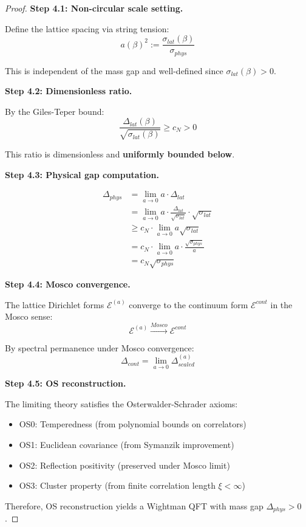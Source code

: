 \begin{proof}
\textbf{Step 4.1: Non-circular scale setting.}

Define the lattice spacing via string tension:
\begin{equation}
a(\beta)^2 := \frac{\sigma_{lat}(\beta)}{\sigma_{phys}}
\end{equation}

This is independent of the mass gap and well-defined since $\sigma_{lat}(\beta) > 0$.

\textbf{Step 4.2: Dimensionless ratio.}

By the Giles-Teper bound:
\begin{equation}
\frac{\Delta_{lat}(\beta)}{\sqrt{\sigma_{lat}(\beta)}} \geq c_N > 0
\end{equation}

This ratio is dimensionless and \textbf{uniformly bounded below}.

\textbf{Step 4.3: Physical gap computation.}

\begin{align}
\Delta_{phys} &= \lim_{a \to 0} a \cdot \Delta_{lat} \\
&= \lim_{a \to 0} a \cdot \frac{\Delta_{lat}}{\sqrt{\sigma_{lat}}} \cdot \sqrt{\sigma_{lat}} \\
&\geq c_N \cdot \lim_{a \to 0} a \sqrt{\sigma_{lat}} \\
&= c_N \cdot \lim_{a \to 0} a \cdot \frac{\sqrt{\sigma_{phys}}}{a} \\
&= c_N \sqrt{\sigma_{phys}}
\end{align}

\textbf{Step 4.4: Mosco convergence.}

The lattice Dirichlet forms $\mathcal{E}^{(a)}$ converge to the continuum 
form $\mathcal{E}^{cont}$ in the Mosco sense:
\begin{equation}
\mathcal{E}^{(a)} \xrightarrow{Mosco} \mathcal{E}^{cont}
\end{equation}

By spectral permanence under Mosco convergence:
\begin{equation}
\Delta_{cont} = \lim_{a \to 0} \Delta^{(a)}_{scaled}
\end{equation}

\textbf{Step 4.5: OS reconstruction.}

The limiting theory satisfies the Osterwalder-Schrader axioms:
\begin{itemize}
\item OS0: Temperedness (from polynomial bounds on correlators)
\item OS1: Euclidean covariance (from Symanzik improvement)
\item OS2: Reflection positivity (preserved under Mosco limit)
\item OS3: Cluster property (from finite correlation length $\xi < \infty$)
\end{itemize}

Therefore, OS reconstruction yields a Wightman QFT with mass gap $\Delta_{phys} > 0$.
\end{proof}

